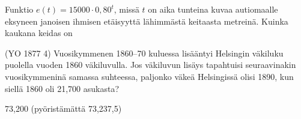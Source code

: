 \begin{tehtavasivu}
\begin{tehtava}
Funktio $ e(t)=15000\cdot 0,80^{t}$, missä $ t $ on aika tunteina kuvaa autiomaalle eksyneen janoisen ihmisen etäisyyttä lähimmästä keitaasta metreinä. Kuinka kaukana keidas on 
\begin{alakohdat}
\end{alakohdat}
\begin{vastaus}
\begin{alakohdat}
\end{alakohdat}
\end{vastaus}
\end{tehtava}

\begin{tehtava}
(YO 1877 4) Vuosikymmenen 1860--70 kuluessa lisääntyi Helsingin väkiluku puolella vuoden 1860 väkiluvulla. Jos väkiluvun lisäys tapahtuisi seuraavinakin vuosikymmeninä samassa suhteessa, paljonko väkeä Helsingissä olisi 1890, kun siellä 1860 oli 21,700 asukasta? 
	\begin{vastaus}
	73,200 (pyöristämättä 73,237,5)
	\end{vastaus}
\end{tehtava}



\end{tehtavasivu}

